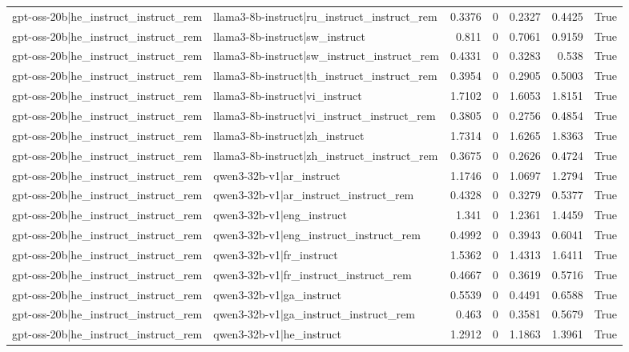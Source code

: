 \begin{table}
\begin{tabular}{l l r r r r l}
gpt-oss-20b|he_instruct_instruct_rem & llama3-8b-instruct|ru_instruct_instruct_rem & 0.3376 & 0 & 0.2327 & 0.4425 & True \\
gpt-oss-20b|he_instruct_instruct_rem & llama3-8b-instruct|sw_instruct & 0.811 & 0 & 0.7061 & 0.9159 & True \\
gpt-oss-20b|he_instruct_instruct_rem & llama3-8b-instruct|sw_instruct_instruct_rem & 0.4331 & 0 & 0.3283 & 0.538 & True \\
gpt-oss-20b|he_instruct_instruct_rem & llama3-8b-instruct|th_instruct_instruct_rem & 0.3954 & 0 & 0.2905 & 0.5003 & True \\
gpt-oss-20b|he_instruct_instruct_rem & llama3-8b-instruct|vi_instruct & 1.7102 & 0 & 1.6053 & 1.8151 & True \\
gpt-oss-20b|he_instruct_instruct_rem & llama3-8b-instruct|vi_instruct_instruct_rem & 0.3805 & 0 & 0.2756 & 0.4854 & True \\
gpt-oss-20b|he_instruct_instruct_rem & llama3-8b-instruct|zh_instruct & 1.7314 & 0 & 1.6265 & 1.8363 & True \\
gpt-oss-20b|he_instruct_instruct_rem & llama3-8b-instruct|zh_instruct_instruct_rem & 0.3675 & 0 & 0.2626 & 0.4724 & True \\
gpt-oss-20b|he_instruct_instruct_rem & qwen3-32b-v1|ar_instruct & 1.1746 & 0 & 1.0697 & 1.2794 & True \\
gpt-oss-20b|he_instruct_instruct_rem & qwen3-32b-v1|ar_instruct_instruct_rem & 0.4328 & 0 & 0.3279 & 0.5377 & True \\
gpt-oss-20b|he_instruct_instruct_rem & qwen3-32b-v1|eng_instruct & 1.341 & 0 & 1.2361 & 1.4459 & True \\
gpt-oss-20b|he_instruct_instruct_rem & qwen3-32b-v1|eng_instruct_instruct_rem & 0.4992 & 0 & 0.3943 & 0.6041 & True \\
gpt-oss-20b|he_instruct_instruct_rem & qwen3-32b-v1|fr_instruct & 1.5362 & 0 & 1.4313 & 1.6411 & True \\
gpt-oss-20b|he_instruct_instruct_rem & qwen3-32b-v1|fr_instruct_instruct_rem & 0.4667 & 0 & 0.3619 & 0.5716 & True \\
gpt-oss-20b|he_instruct_instruct_rem & qwen3-32b-v1|ga_instruct & 0.5539 & 0 & 0.4491 & 0.6588 & True \\
gpt-oss-20b|he_instruct_instruct_rem & qwen3-32b-v1|ga_instruct_instruct_rem & 0.463 & 0 & 0.3581 & 0.5679 & True \\
gpt-oss-20b|he_instruct_instruct_rem & qwen3-32b-v1|he_instruct & 1.2912 & 0 & 1.1863 & 1.3961 & True \\

\end{tabular}
\end{table}
